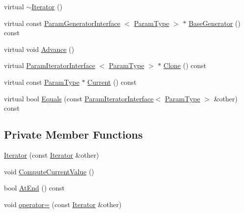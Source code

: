 \begin{DoxyCompactItemize}
\item 
virtual \hyperlink{classtesting_1_1internal_1_1CartesianProductGenerator9_1_1Iterator_a47b331bac1d130f2bab2c40e76ccb54a}{$\sim$\-Iterator} ()
\item 
virtual const \*
\hyperlink{classtesting_1_1internal_1_1ParamGeneratorInterface}{\-Param\-Generator\-Interface}\*
$<$ \hyperlink{classtesting_1_1internal_1_1CartesianProductGenerator9_a311b2d1d5a489d4841f258a70f33bf9d}{\-Param\-Type} $>$ $\ast$ \hyperlink{classtesting_1_1internal_1_1CartesianProductGenerator9_1_1Iterator_a297272d14c33d1d5423da2a4776f895b}{\-Base\-Generator} () const 
\item 
virtual void \hyperlink{classtesting_1_1internal_1_1CartesianProductGenerator9_1_1Iterator_aaa5a890708f89affa1a7726cf152c872}{\-Advance} ()
\item 
virtual \hyperlink{classtesting_1_1internal_1_1ParamIteratorInterface}{\-Param\-Iterator\-Interface}\*
$<$ \hyperlink{classtesting_1_1internal_1_1CartesianProductGenerator9_a311b2d1d5a489d4841f258a70f33bf9d}{\-Param\-Type} $>$ $\ast$ \hyperlink{classtesting_1_1internal_1_1CartesianProductGenerator9_1_1Iterator_a4bee4982ee1152c6935ffd0c2d749421}{\-Clone} () const 
\item 
virtual const \hyperlink{classtesting_1_1internal_1_1CartesianProductGenerator9_a311b2d1d5a489d4841f258a70f33bf9d}{\-Param\-Type} $\ast$ \hyperlink{classtesting_1_1internal_1_1CartesianProductGenerator9_1_1Iterator_ab27aeab5db14a30f077a37989ce9261c}{\-Current} () const 
\item 
virtual bool \hyperlink{classtesting_1_1internal_1_1CartesianProductGenerator9_1_1Iterator_a8f18f9a017a12730cce28c07460bbc14}{\-Equals} (const \hyperlink{classtesting_1_1internal_1_1ParamIteratorInterface}{\-Param\-Iterator\-Interface}$<$ \hyperlink{classtesting_1_1internal_1_1CartesianProductGenerator9_a311b2d1d5a489d4841f258a70f33bf9d}{\-Param\-Type} $>$ \&other) const 
\end{DoxyCompactItemize}
\subsection*{\-Private \-Member \-Functions}
\begin{DoxyCompactItemize}
\item 
\hyperlink{classtesting_1_1internal_1_1CartesianProductGenerator9_1_1Iterator_a2b76c2e597bc9393f2b99e869e4fa8d2}{\-Iterator} (const \hyperlink{classtesting_1_1internal_1_1CartesianProductGenerator9_1_1Iterator}{\-Iterator} \&other)
\item 
void \hyperlink{classtesting_1_1internal_1_1CartesianProductGenerator9_1_1Iterator_a4c18cbbef042bab72ed484f5b6923908}{\-Compute\-Current\-Value} ()
\item 
bool \hyperlink{classtesting_1_1internal_1_1CartesianProductGenerator9_1_1Iterator_a6eb9b47ffa4b10f0dca403fc597faba0}{\-At\-End} () const 
\item 
void \hyperlink{classtesting_1_1internal_1_1CartesianProductGenerator9_1_1Iterator_ac087d740f6aa05ec07afd0c5c0327105}{operator=} (const \hyperlink{classtesting_1_1internal_1_1CartesianProductGenerator9_1_1Iterator}{\-Iterator} \&other)
\end{DoxyCompactItemize}
